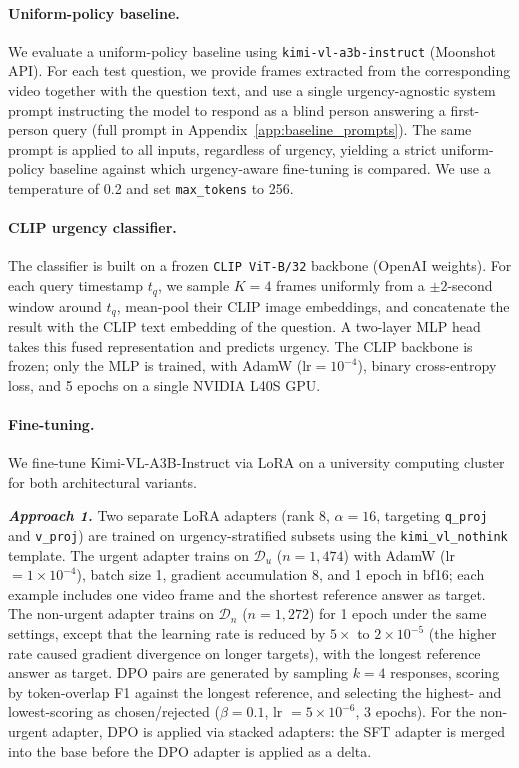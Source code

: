 \documentclass{article}
\begin{document}
\paragraph{Uniform-policy baseline.}
We evaluate a uniform-policy baseline using \texttt{kimi-vl-a3b-instruct} (Moonshot API). For each test question, we provide frames extracted from the corresponding video together with the question text, and use a single urgency-agnostic system prompt instructing the model to respond as a blind person answering a first-person query (full prompt in Appendix~\ref{app:baseline_prompts}). The same prompt is applied to all inputs, regardless of urgency, yielding a strict uniform-policy baseline against which urgency-aware fine-tuning is compared. We use a temperature of 0.2 and set \texttt{max\_tokens} to 256.

\paragraph{CLIP urgency classifier.}
The classifier is built on a frozen \texttt{CLIP ViT-B/32} backbone (OpenAI weights). For each query timestamp $t_q$, we sample $K = 4$ frames uniformly from a $\pm 2$-second window around $t_q$, mean-pool their CLIP image embeddings, and concatenate the result with the CLIP text embedding of the question. A two-layer MLP head takes this fused representation and predicts urgency. The CLIP backbone is frozen; only the MLP is trained, with AdamW ($\text{lr} = 10^{-4}$), binary cross-entropy loss, and 5 epochs on a single NVIDIA L40S GPU.

\paragraph{Fine-tuning.}
We fine-tune Kimi-VL-A3B-Instruct \cite{kimivl2025} via LoRA \cite{hu2022lora} on a university computing cluster for both architectural variants.

\textit{\textbf{Approach 1.}}
Two separate LoRA adapters (rank 8, $\alpha = 16$, targeting \texttt{q\_proj} and \texttt{v\_proj}) are trained on urgency-stratified subsets using the \texttt{kimi\_vl\_nothink} template. The urgent adapter trains on $\mathcal{D}_u$ ($n = 1{,}474$) with AdamW (lr $= 1 \times 10^{-4}$), batch size 1, gradient accumulation 8, and 1 epoch in bf16; each example includes one video frame and the shortest reference answer as target. The non-urgent adapter trains on $\mathcal{D}_n$ ($n = 1{,}272$) for 1 epoch under the same settings, except that the learning rate is reduced by $5\times$ to $2 \times 10^{-5}$ (the higher rate caused gradient divergence on longer targets), with the longest reference answer as target. DPO pairs are generated by sampling $k = 4$ responses, scoring by token-overlap F1 against the longest reference, and selecting the highest- and lowest-scoring as chosen/rejected ($\beta = 0.1$, lr $= 5 \times 10^{-6}$, 3 epochs). For the non-urgent adapter, DPO is applied via stacked adapters: the SFT adapter is merged into the base before the DPO adapter is applied as a delta.
\end{document}
